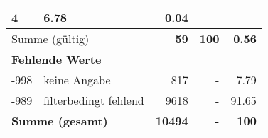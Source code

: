 \begin{longtable}{lXrrr}
       \num{4} &
       \num[round-mode=places,round-precision=2]{6,78} &
         \num[round-mode=places,round-precision=2]{0,04} \\
     \midrule
     \multicolumn{2}{l}{Summe (gültig)} &
       \textbf{\num{59}} &
     \textbf{100} &
       \textbf{\num[round-mode=places,round-precision=2]{0,56}} \\
     \multicolumn{5}{l}{\textbf{Fehlende Werte}}\\
       -998 &
       keine Angabe &
         \num{817} &
        - &
         \num[round-mode=places,round-precision=2]{7,79} \\
       -989 &
       filterbedingt fehlend &
         \num{9618} &
        - &
         \num[round-mode=places,round-precision=2]{91,65} \\
     \midrule
     \multicolumn{2}{l}{\textbf{Summe (gesamt)}} &
          \textbf{\num{10494}} &
        \textbf{-} &
        \textbf{100} \\
     \bottomrule
     \end{longtable}
     
